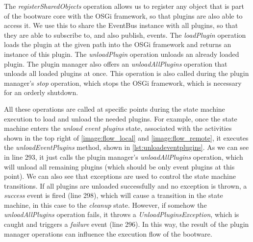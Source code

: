The \textit{registerSharedObjects} operation allows us to register any object that is part of the bootware core with the OSGi framework, so that plugins are also able to access it.
We use this to share the EventBus instance with all plugins, so that they are able to subscribe to, and also publish, events.
The \textit{loadPlugin} operation loads the plugin at the given path into the OSGi framework and returns an instance of this plugin.
The \textit{unloadPlugin} operation unloads an already loaded plugin.
The plugin manager also offers an \textit{unloadAllPlugins} operation that unloads all loaded plugins at once.
This operation is also called during the plugin manager's \textit{stop} operation, which stops the OSGi framework, which is necessary for an orderly shutdown.

\vspace*{\baselineskip}

All these operations are called at specific points during the state machine execution to load and unload the needed plugins.
For example, once the state machine enters the \textit{unload event plugins} state, associated with the activities shown in the top right of \autoref{image:flow_local} and \autoref{image:flow_remote}, it executes the \textit{unloadEventPlugins} method, shown in \autoref{lst:unloadeventplugins}.
As we can see in line 293, it just calls the plugin manager's \textit{unloadAllPlugins} operation, which will unload all remaining plugins (which should be only event plugins at this point).
We can also see that exceptions are used to control the state machine transitions.
If all plugins are unloaded successfully and no exception is thrown, a \textit{success} event is fired (line 298), which will cause a transition in the state machine, in this case to the \textit{cleanup} state.
However, if somehow the \textit{unloadAllPlugins} operation fails, it throws a \textit{UnloadPluginsException}, which is caught and triggers a \textit{failure} event (line 296).
In this way, the result of the plugin manager operations can influence the execution flow of the bootware.

\vspace*{\baselineskip}
